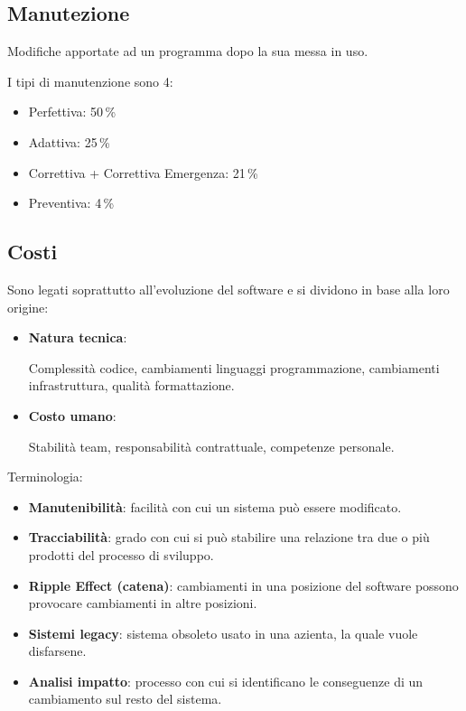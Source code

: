 \documentclass{report}
\begin{document}
\subsection*{Manutezione}
Modifiche apportate ad un programma dopo la sua messa in uso.

\noindent
I tipi di manutenzione sono 4:
\begin{itemize}
    \item Perfettiva: 50\,\%
    \item Adattiva: 25\,\%
    \item Correttiva + Correttiva Emergenza: 21\,\%
    \item Preventiva: 4\,\%
\end{itemize}

\subsection*{Costi}
Sono legati soprattutto all'evoluzione del software e si dividono in base alla loro origine:
\begin{itemize}
    \item \textbf{Natura tecnica}:
    
    \noindent
    Complessità codice, cambiamenti linguaggi programmazione, cambiamenti infrastruttura, qualità formattazione.

    \item \textbf{Costo umano}:

    \noindent
    Stabilità team, responsabilità contrattuale, competenze personale.
\end{itemize}

\noindent
Terminologia:
\begin{itemize}
    \item \textbf{Manutenibilità}: facilità con cui un sistema può essere modificato.
    \item \textbf{Tracciabilità}: grado con cui si può stabilire una relazione tra due o più prodotti del processo di sviluppo.
    \item \textbf{Ripple Effect (catena)}: cambiamenti in una posizione del software possono provocare cambiamenti in altre posizioni.
    \item \textbf{Sistemi legacy}: sistema obsoleto usato in una azienta, la quale vuole disfarsene.
    \item \textbf{Analisi impatto}: processo con cui si identificano le conseguenze di un cambiamento sul resto del sistema.
\end{itemize}
\end{document}
